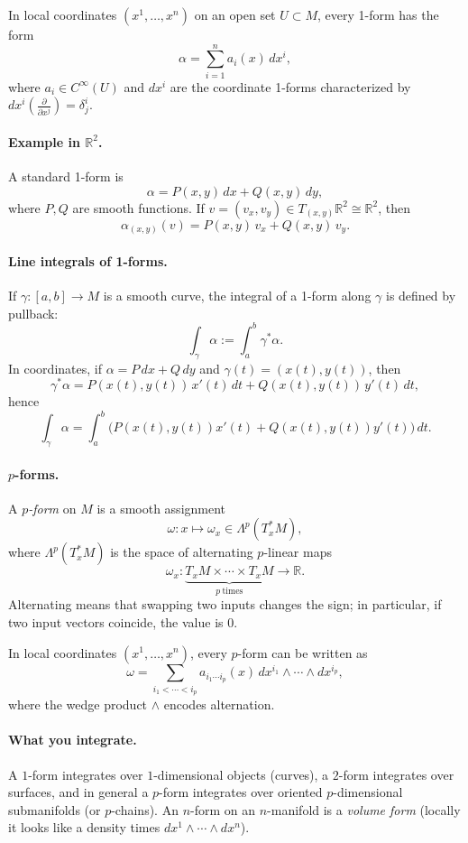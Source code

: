 \documentclass[12pt,a4paper]{article}
\theoremstyle{plain}
\theoremstyle{definition}      %
\begin{document}
In local coordinates $(x^1,\dots,x^n)$ on an open set $U\subset M$, every 1-form has the form
\[
\alpha = \sum_{i=1}^n a_i(x)\, dx^i,
\]
where $a_i\in C^\infty(U)$ and $dx^i$ are the coordinate 1-forms characterized by
$dx^i\!\left(\frac{\partial}{\partial x^j}\right)=\delta^i_j$.

\paragraph{Example in $\mathbb{R}^2$.}
A standard 1-form is
\[
\alpha = P(x,y)\,dx + Q(x,y)\,dy,
\]
where $P,Q$ are smooth functions. If $v=(v_x,v_y)\in T_{(x,y)}\mathbb{R}^2\cong\mathbb{R}^2$, then
\[
\alpha_{(x,y)}(v)=P(x,y)\,v_x + Q(x,y)\,v_y.
\]

\paragraph{Line integrals of 1-forms.}
If $\gamma:[a,b]\to M$ is a smooth curve, the integral of a 1-form along $\gamma$ is defined by pullback:
\[
\int_\gamma \alpha := \int_a^b \gamma^*\alpha.
\]
In coordinates, if $\alpha=P\,dx+Q\,dy$ and $\gamma(t)=(x(t),y(t))$, then
\[
\gamma^*\alpha = P(x(t),y(t))\,x'(t)\,dt + Q(x(t),y(t))\,y'(t)\,dt,
\]
hence
\[
\int_\gamma \alpha = \int_a^b \Big(P(x(t),y(t))x'(t)+Q(x(t),y(t))y'(t)\Big)\,dt.
\]

\paragraph{$p$-forms.}
A \emph{$p$-form} on $M$ is a smooth assignment
\[
\omega: x \mapsto \omega_x \in \Lambda^p(T_x^*M),
\]
where $\Lambda^p(T_x^*M)$ is the space of alternating $p$-linear maps
\[
\omega_x:\underbrace{T_xM\times\cdots\times T_xM}_{p\ \text{times}} \to \mathbb{R}.
\]
Alternating means that swapping two inputs changes the sign; in particular, if two input vectors coincide,
the value is $0$.

In local coordinates $(x^1,\dots,x^n)$, every $p$-form can be written as
\[
\omega = \sum_{i_1<\cdots<i_p} a_{i_1\cdots i_p}(x)\, dx^{i_1}\wedge\cdots\wedge dx^{i_p},
\]
where the wedge product $\wedge$ encodes alternation.

\paragraph{What you integrate.}
A $1$-form integrates over $1$-dimensional objects (curves), a $2$-form integrates over surfaces,
and in general a $p$-form integrates over oriented $p$-dimensional submanifolds (or $p$-chains).
An $n$-form on an $n$-manifold is a \emph{volume form} (locally it looks like a density times
$dx^1\wedge\cdots\wedge dx^n$).
\end{document}
